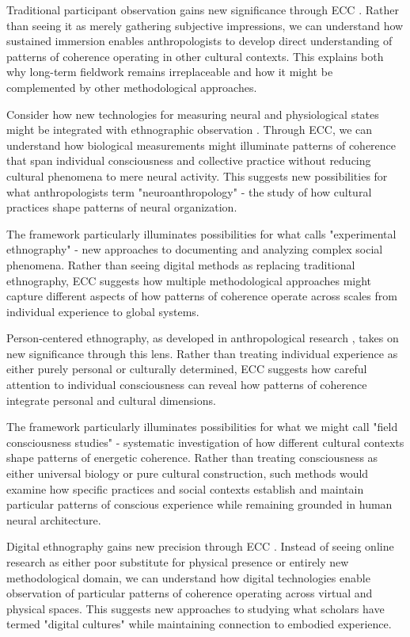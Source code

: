 \begin{refsection}
Traditional participant observation gains new significance through ECC \cite{fortun2012ethnography}. Rather than seeing it as merely gathering subjective impressions, we can understand how sustained immersion enables anthropologists to develop direct understanding of patterns of coherence operating in other cultural contexts. This explains both why long-term fieldwork remains irreplaceable and how it might be complemented by other methodological approaches.

Consider how new technologies for measuring neural and physiological states might be integrated with ethnographic observation \cite{roepstorff2013slow}. Through ECC, we can understand how biological measurements might illuminate patterns of coherence that span individual consciousness and collective practice without reducing cultural phenomena to mere neural activity. This suggests new possibilities for what anthropologists term "neuroanthropology" - the study of how cultural practices shape patterns of neural organization.

The framework particularly illuminates possibilities for what \cite{fortun2012ethnography} calls "experimental ethnography" - new approaches to documenting and analyzing complex social phenomena. Rather than seeing digital methods as replacing traditional ethnography, ECC suggests how multiple methodological approaches might capture different aspects of how patterns of coherence operate across scales from individual experience to global systems.

Person-centered ethnography, as developed in anthropological research \cite{hollan2000constructivist}, takes on new significance through this lens. Rather than treating individual experience as either purely personal or culturally determined, ECC suggests how careful attention to individual consciousness can reveal how patterns of coherence integrate personal and cultural dimensions.

The framework particularly illuminates possibilities for what we might call "field consciousness studies" \cite{myers2015rendering} - systematic investigation of how different cultural contexts shape patterns of energetic coherence. Rather than treating consciousness as either universal biology or pure cultural construction, such methods would examine how specific practices and social contexts establish and maintain particular patterns of conscious experience while remaining grounded in human neural architecture.

Digital ethnography gains new precision through ECC \cite{pink2016digital}. Instead of seeing online research as either poor substitute for physical presence or entirely new methodological domain, we can understand how digital technologies enable observation of particular patterns of coherence operating across virtual and physical spaces. This suggests new approaches to studying what scholars have termed "digital cultures" while maintaining connection to embodied experience.


\end{refsection}
